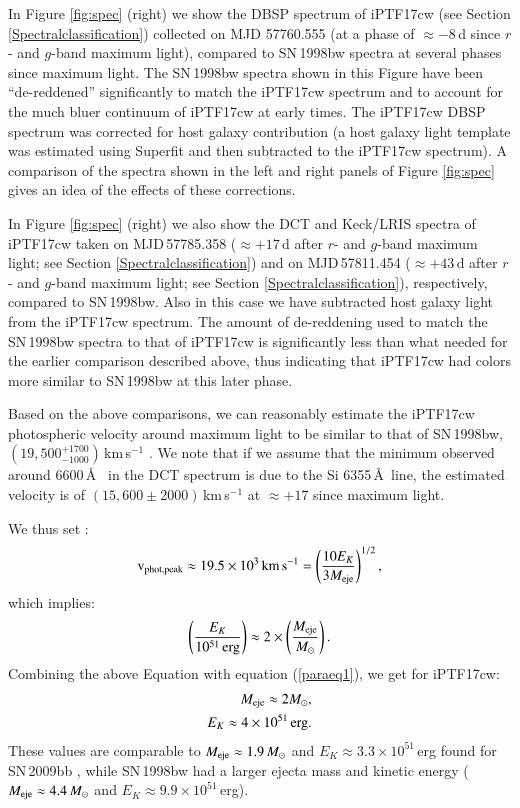 \documentclass[twocolumn]{emulateapj}
\begin{document}
In Figure \ref{fig:spec} (right) we show the DBSP spectrum of iPTF17cw (see Section \ref{Spectralclassification}) collected on 
MJD 57760.555 (at a phase of $\approx -8$\,d since $r$- and $g$-band maximum light), compared to SN\,1998bw spectra 
at several phases since maximum light. The SN\,1998bw spectra shown in this Figure have been ``de-reddened''
significantly to match the iPTF17cw spectrum and to account for the much bluer continuum of iPTF17cw at early times.
The iPTF17cw DBSP spectrum was corrected for host galaxy contribution 
(a host galaxy light template was estimated using Superfit and then subtracted to the iPTF17cw spectrum). A comparison of the spectra 
shown in the left and right panels of Figure \ref{fig:spec} gives an idea of the effects of these corrections.

In Figure \ref{fig:spec} (right) we also show the DCT and Keck/LRIS spectra of iPTF17cw taken on MJD\,57785.358 ($\approx +17$\,d after $r$- and $g$-band maximum light; see Section \ref{Spectralclassification}) and on MJD\,57811.454 ($\approx +43$\,d after $r$- and $g$-band maximum light; see Section \ref{Spectralclassification}), respectively, compared to SN\,1998bw. Also in this case we have subtracted host galaxy light from the iPTF17cw spectrum. The amount of de-reddening used to match the SN\,1998bw spectra to that of iPTF17cw is significantly less than what needed for the earlier comparison described above, thus indicating that iPTF17cw had colors more similar to SN\,1998bw at this later phase. 

Based on the above comparisons, we can reasonably estimate the iPTF17cw photospheric velocity around maximum light to be similar to that of SN\,1998bw, $(19,500^{+1700}_{-1000})$\,km\,s$^{-1}$ \citep[see ][and references therein]{Lyman2016}. We note that if we assume that the minimum observed around 6600\,\AA~ in the DCT spectrum is due to the Si 6355\,\AA\ line, the estimated velocity  is of $(15,600\pm2000)$\,km\,s$^{-1}$ at $\approx +17$ since maximum light.  

We thus set \citep[see e.g. Eq. 2 in][]{Lyman2016}:
\begin{equation}
{\rm v}_{\rm phot,peak}\approx 19.5\times10^{3}{\rm \,km\,s}^{-1}=\left(\frac{10E_K}{3 M_{\rm eje}}\right)^{1/2},
\end{equation}
which implies:
\begin{equation}
\left(\frac{E_K}{10^{51}\,\rm erg}\right)\approx 2 \times\left(\frac{M_{\rm eje}}{M_{\odot}}\right).
\label{paraeq2}
\end{equation}
Combining the above Equation with equation (\ref{paraeq1}), we get for iPTF17cw:
\begin{eqnarray}
M_{\rm eje}\approx 2 M_{\odot},\\
E_K\approx 4 \times 10^{51}\,{\rm erg}.
\label{eneK}
\end{eqnarray}
These values are comparable to $M_{\rm eje}\approx 1.9\,M_{\odot}$ and $E_K\approx 3.3\times10^{51}$\,erg found for SN\,2009bb \citep[see Table 5 in][]{Lyman2016}, while SN\,1998bw had a larger ejecta mass and kinetic energy ($M_{\rm eje}\approx 4.4\,M_{\odot}$ and $E_K\approx 9.9\times10^{51}$\,erg).
\end{document}
